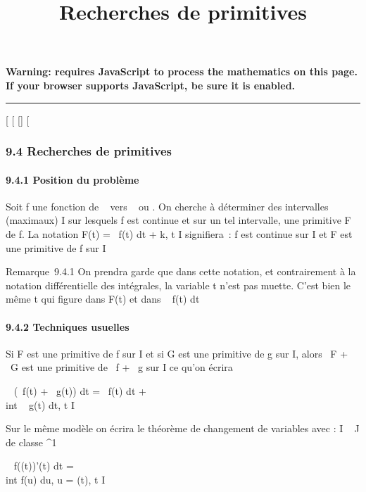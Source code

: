 \documentclass[]{article}
\title{Recherches de primitives}
\author{}
\date{}
\begin{document}
\maketitle

\textbf{Warning: 
requires JavaScript to process the mathematics on this page.\\ If your
browser supports JavaScript, be sure it is enabled.}

\begin{center}\rule{3in}{0.4pt}\end{center}

[
[
[]
[

\subsubsection{9.4 Recherches de primitives}

\paragraph{9.4.1 Position du problème}

Soit f une fonction de ~ vers ~ ou . On cherche à déterminer des
intervalles (maximaux) I sur lesquels f est continue et sur un tel
intervalle, une primitive F de f. La notation F(t)
=\int ~ f(t) dt + k, t \in I signifiera~: f est
continue sur I et F est une primitive de f sur I

Remarque~9.4.1 On prendra garde que dans cette notation, et
contrairement à la notation différentielle des intégrales, la variable t
n'est pas muette. C'est bien le même t qui figure dans F(t) et dans
\int ~ f(t) dt

\paragraph{9.4.2 Techniques usuelles}

Si F est une primitive de f sur I et si G est une primitive de g sur I,
alors \alpha~F + \beta~G est une primitive de \alpha~f + \beta~g sur I ce qu'on écrira

\int ~ (\alpha~f(t) + \beta~g(t)) dt =
\alpha~\int  f(t) dt + \beta~\\int ~
g(t) dt, t \in I

Sur le même modèle on écrira le théorème de changement de variables avec
\phi : I \rightarrow~ J de classe ^1

\int ~ f(\phi(t))\phi'(t) dt =\\int
 f(u) du, u = \phi(t), t \in I
\end{document}
